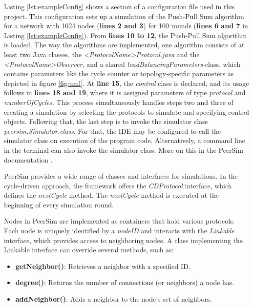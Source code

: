 Listing \ref{lst:exampleConfig} shows a section of a configuration file used in this project. This configuration sets up a simulation of the Push-Pull Sum algorithm for a network with 1024 nodes (\textbf{lines 2 and 3}) for 100 rounds (\textbf{lines 6 and 7} in Listing \ref{lst:exampleConfig}). From \textbf{lines 10 to 12}, the Push-Pull Sum algorithm is loaded. The way the algorithms are implemented, one algorithm consists of at least two Java classes, the \textit{<ProtocolName>Protocol.java} and the \textit{<ProtocolName>Observer}, and a shared \textit{loadBalancingParameters}-class, which contains parameters like the cycle counter or topology-specific parameters as depicted in figure \ref{fig:uml}. At \textbf{line 15}, the \textit{control} class is declared, and its usage follows in \textbf{lines 18 and 19}, where it is assigned parameters of type \textit{protocol} and \textit{numberOfCycles}. This process simultaneously handles steps two and three of creating a simulation by selecting the protocols to simulate and specifying control objects. Following that, the last step is to invoke the simulator class \textit{peersim.Simulator.class}. For that, the IDE may be configured to call the simulator class on execution of the program code. Alternatively, a command line in the terminal can also invoke the simulator class. More on this in the PeerSim documentation \cite{peersimdocs}.

PeerSim provides a wide range of classes and interfaces for simulations. In the cycle-driven approach, the framework offers the \textit{CDProtocol} interface, which defines the \textit{nextCycle} method. The \textit{nextCycle} method is executed at the beginning of every simulation round.

Nodes in PeerSim are implemented as containers that hold various protocols. Each node is uniquely identified by a \textit{nodeID} and interacts with the \textit{Linkable} interface, which provides access to neighboring nodes. A class implementing the Linkable interface can override several methods, such as:

\begin{itemize}
    \item \textbf{getNeighbor()}: Retrieves a neighbor with a specified ID.
    \item \textbf{degree()}: Returns the number of connections (or neighbors) a node has.
    \item \textbf{addNeighbor()}: Adds a neighbor to the node's set of neighbors.
\end{itemize}

